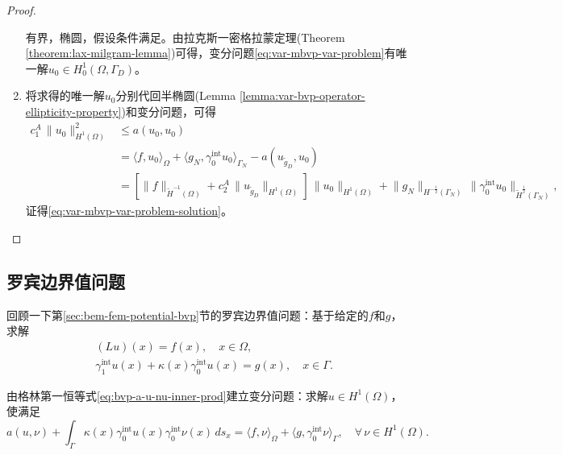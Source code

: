 \begin{proof}
\begin{enumerate}
有界，椭圆，假设条件满足。由拉克斯一密格拉蒙定理(Theorem \ref{theorem:lax-milgram-lemma})可得，变分问题\eqref{eq:var-mbvp-var-problem}有唯一解$u_0 \in H_{0}^{1} (\Omega, \Gamma_{D})$。

\item 将求得的唯一解$u_0$分别代回半椭圆(Lemma \ref{lemma:var-bvp-operator-ellipticity-property})和变分问题，可得
\begin{equation*}
  \begin{split}
    c_{1}^{A} \, \big\| u_0 \big\|_{H^{1}(\Omega)}^{2} &\le a(u_0, u_0) \\
    & = \langle f, u_0 \rangle_{\Omega}
    + \langle g_{N}, \gamma_{0}^{\text{int}} u_0 \rangle_{\Gamma_{N}}
    - a(u_{\widetilde{g}_{D}}, u_0) \\
    & =
    \left[
    \big\| f \big\|_{\widetilde{H}^{-1} (\Omega)}
    + c_{2}^{A} \, \big\| u_{\widetilde{g}_{D}} \big\|_{H^{1}(\Omega)}
    \right] \, \big\| u_0 \big\|_{H^{1}(\Omega)}
    + \big\| g_{N} \big\|_{H^{-\frac{1}{2}}(\Gamma_{N})} \,
    \big\| \gamma_{0}^{\text{int}} u_0 \big\|_{\widetilde{H}^{\frac{1}{2}}(\Gamma_N)},
  \end{split}
\end{equation*}
证得\eqref{eq:var-mbvp-var-problem-solution}。
\end{enumerate}
\end{proof}

\subsection{罗宾边界值问题}
回顾一下第\ref{sec:bem-fem-potential-bvp}节的罗宾边界值问题：基于给定的$f$和$g$，求解
\begin{equation}
  \label{eq:var-rbvp-var}
  \begin{split}
    &(L u)(x) = f(x), \quad x \in \Omega, \\
    & \gamma_{1}^{\text{int}} u(x) + \kappa(x) \gamma_{0}^{\text{int}} u(x) = g(x), \quad x \in \Gamma.
  \end{split}
\end{equation}

由格林第一恒等式\eqref{eq:bvp-a-u-nu-inner-prod}建立变分问题：求解$u \in H^{1}(\Omega)$，使满足
\begin{equation}
  \label{eq:var-rbvp-var-problem}
  a(u,\nu) + \int_{\Gamma} \kappa(x) \gamma_{0}^{\text{int}} u(x) \gamma_{0}^{\text{int}} \nu(x) \, d s_{x}
  = \langle f, \nu \rangle_{\Omega}
  + \langle g, \gamma_{0}^{\text{int}} \nu \rangle_{\Gamma}, \quad \forall \, \nu \in H^{1}(\Omega).
\end{equation}

